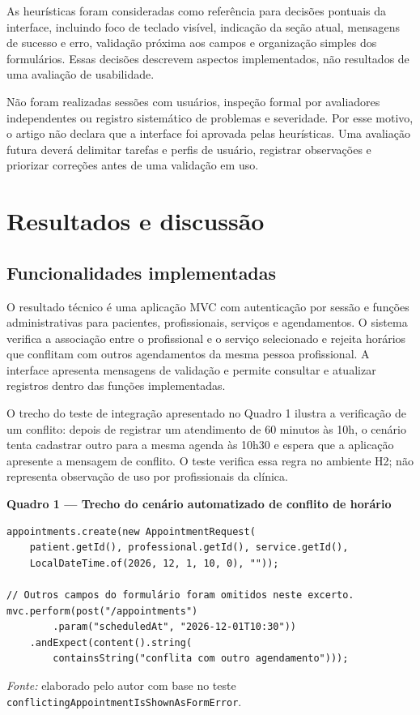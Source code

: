 \documentclass[12pt,a4paper]{article}
\begin{document}
As heurísticas foram consideradas como referência para decisões pontuais da interface, incluindo foco de teclado visível, indicação da seção atual, mensagens de sucesso e erro, validação próxima aos campos e organização simples dos formulários. Essas decisões descrevem aspectos implementados, não resultados de uma avaliação de usabilidade.

Não foram realizadas sessões com usuários, inspeção formal por avaliadores independentes ou registro sistemático de problemas e severidade. Por esse motivo, o artigo não declara que a interface foi aprovada pelas heurísticas. Uma avaliação futura deverá delimitar tarefas e perfis de usuário, registrar observações e priorizar correções antes de uma validação em uso.

\section{Resultados e discussão}

\subsection{Funcionalidades implementadas}

O resultado técnico é uma aplicação MVC com autenticação por sessão e funções administrativas para pacientes, profissionais, serviços e agendamentos. O sistema verifica a associação entre o profissional e o serviço selecionado e rejeita horários que conflitam com outros agendamentos da mesma pessoa profissional. A interface apresenta mensagens de validação e permite consultar e atualizar registros dentro das funções implementadas.

O trecho do teste de integração apresentado no Quadro 1 ilustra a verificação de um conflito: depois de registrar um atendimento de 60 minutos às 10h, o cenário tenta cadastrar outro para a mesma agenda às 10h30 e espera que a aplicação apresente a mensagem de conflito. O teste verifica essa regra no ambiente H2; não representa observação de uso por profissionais da clínica.

\begin{center}
\textbf{Quadro 1 --- Trecho do cenário automatizado de conflito de horário}
\end{center}
\begin{lstlisting}[style=javaarticle]
appointments.create(new AppointmentRequest(
    patient.getId(), professional.getId(), service.getId(),
    LocalDateTime.of(2026, 12, 1, 10, 0), ""));

// Outros campos do formulário foram omitidos neste excerto.
mvc.perform(post("/appointments")
        .param("scheduledAt", "2026-12-01T10:30"))
    .andExpect(content().string(
        containsString("conflita com outro agendamento")));
\end{lstlisting}
\noindent\textit{Fonte:} elaborado pelo autor com base no teste \texttt{conflictingAppointmentIsShownAsFormError}.
\end{document}
